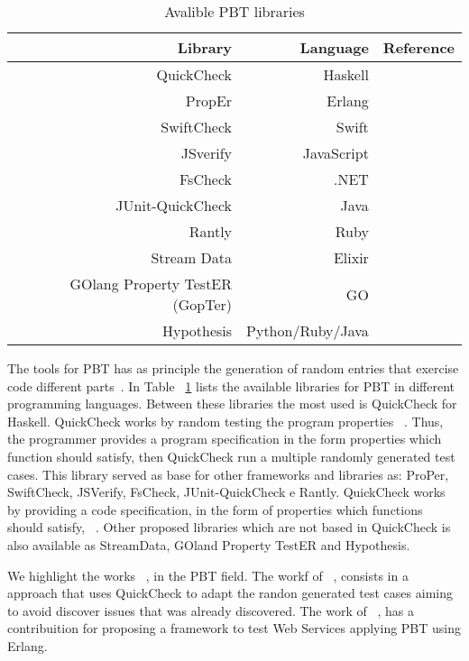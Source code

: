 	\begin{table}[ht]
		\begin{center}
		    \begin{tabular}{|r|r|r|}
		    \hline
		    \textbf{Library} & \textbf{Language} & \textbf{Reference} \\ \hline
		    QuickCheck & Haskell & ~\cite{quickcheck} \\ \hline
		    PropEr & Erlang & ~\cite{proper} \\ \hline
		    SwiftCheck & Swift & ~\cite{swiftcheck} \\ \hline
		    JSverify & JavaScript & ~\cite{jsverify} \\ \hline
		    FsCheck & .NET & ~\cite{fscheck} \\ \hline
		    JUnit-QuickCheck & Java & ~\cite{junit} \\ \hline
		    Rantly & Ruby & ~\cite{rantly} \\ \hline
		    Stream Data & Elixir & ~\cite{stream} \\ \hline
		    GOlang Property TestER (GopTer) & GO & ~\cite{gopter} \\ \hline
		    Hypothesis & Python/Ruby/Java & ~\cite{hyp} \\ \hline 
	    	\end{tabular}
		\end{center}
		\label{tab:libraries}
		\caption{Avalible PBT libraries}
	\end{table}

	The tools for PBT has as principle the generation of random entries that exercise code different parts~\cite{santos2018property}. In Table ~\ref{tab:libraries} lists the available libraries for PBT in different programming languages. Between these libraries the most used is QuickCheck for Haskell. QuickCheck works by random testing the program properties ~\cite{quickcheck}. Thus, the programmer provides a program specification in the form properties which function should satisfy, then QuickCheck run a multiple randomly generated test cases. This library served as base for other frameworks and libraries as: ProPer, SwiftCheck, JSVerify, FsCheck, JUnit-QuickCheck e Rantly. QuickCheck works by providing a code specification, in the form of properties which functions should satisfy,  ~\cite{quickcheck}. Other proposed libraries which are not based in QuickCheck is also available as StreamData, GOland Property TestER and Hypothesis. 

	We highlight the works ~\cite{7809825, article}, in the PBT field. The workf of ~\cite{7809825}, consists in a approach that uses QuickCheck to adapt the randon generated test cases aiming to avoid discover issues that was already discovered. The work of ~\cite{article}, has a contribuition for proposing a framework to test Web Services applying PBT using Erlang.